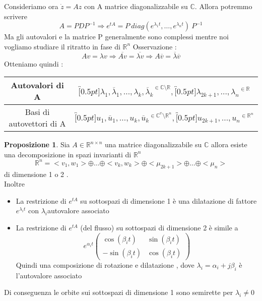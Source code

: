 \documentclass{article}
\theoremstyle{definition}
\newtheorem*{proposizione}{Proposizione}
\newcommand{\R}{\mathbb{R}}
\newcommand{\Rn}{\R^n}
\newcommand{\la}{\lambda}
\begin{document}
Consideriamo ora $\dot{z}=Az $ con A matrice diagonalizzabile su $\mathbb{C}$. Allora potremmo scrivere 
$$A=PDP^{-1}\Rightarrow e^{tA}=P \ diag(e^{\la_1t} , \dots,e^{\la_n t}) \ P^{-1}$$ 
Ma gli autovalori e la matrice P generalmente sono complessi mentre noi vogliamo studiare il ritratto in fase di $\Rn$
Osservazione : $$Av=\la v \Rightarrow \overline{Av}=\overline{\la v} \Rightarrow A\overline{v}=\overline{\la} \overline{v}$$
Otteniamo quindi : \\
\begin{center}
\begin{tabular}{|c|c|}
	\hline
	Autovalori di A & $\overbracket[0.5pt]{\la_1,\overline{\la}_1,\dots,\la_k,\overline{\la}_k}^{\in \mathbb{C}\setminus \R} , \overbracket[0.5pt]{\la_{2k+1},\dots,\la_n}^{\in \R}$  \\
	\hline
	Basi di autovettori di A& $\overbracket[0.5pt]{u_1,\overline{u}_1,\dots,u_k,\overline{u}_k}^{\in \mathbb{C^n}\setminus \Rn} , \overbracket[0.5pt]{u_{2k+1},\dots,u_n}^{\in \Rn}$ \\
	\hline
\end{tabular}
\end{center}
\begin{proposizione}
	Sia  $A \in \R^{n\times n}$ una matrice diagonalizzabile su $\mathbb{C}$ allora esiste una decomposizione in spazi invarianti di $\Rn$ 
	$$\Rn=<v_1,w_1> \oplus \dots \oplus <v_k,w_k> \oplus <\mu_{2k+1}>\oplus \dots \oplus<\mu_n>$$
	di dimensione 1 o 2 .\\
	Inoltre 
	\begin{itemize}
		\item La restrizione di $e^{tA}$ su sottospazi di dimensione 1 è una dilatazione di fattore $e^{\la_i t}$ con $\la_i$autovalore associato 
		\item La restrizione di $e^{tA}$ (del flusso) su sottospazi di dimensione 2 è simile a 
		$$e^{\alpha_i t}\begin{pmatrix}
\cos(\beta_i t) & \sin (\beta_i t) \\
-\sin(\beta_i t) & \cos(\beta_i t)
		\end{pmatrix}$$
		Quindi una composizione di rotazione e dilatazione , dove $\la_i=\alpha_i+j\beta_i $ è l'autovalore associato 
		
	\end{itemize}
\end{proposizione}
Di conseguenza le orbite sui sottospazi di dimensione 1 sono semirette per $\la_i\neq0$ 
\begin{center}
\end{center}
\end{document}
